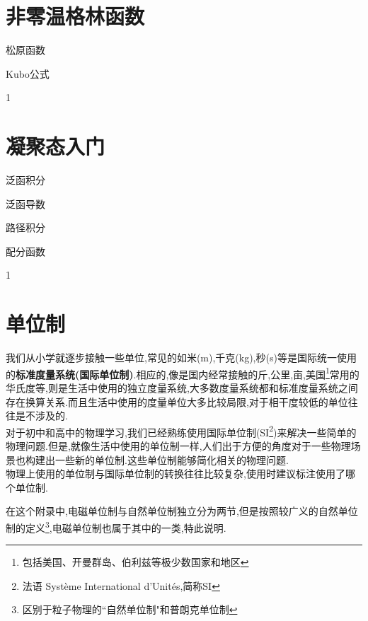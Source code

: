 \documentclass[lang=cn,newtx,10pt,scheme=chinese,thmcnt=section]{elegantbook}
\begin{document}
\chapter{非零温格林函数}
\begin{introduction}
	\item 松原函数
	\item Kubo公式
\end{introduction}
1

\chapter{凝聚态入门}
\begin{introduction}
	\item 泛函积分
	\item 泛函导数
	\item 路径积分
	\item 配分函数
\end{introduction}
1























\nocite{*}

\printbibliography[heading=bibintoc, title=\ebibname]
\appendix

\chapter{单位制}
我们从小学就逐步接触一些单位,常见的如米(m),千克(kg),秒(s)等是国际统一使用的\textbf{标准度量系统(国际单位制)}.相应的,像是国内经常接触的斤,公里,亩,美国\footnote{包括美国、开曼群岛、伯利兹等极少数国家和地区}常用的华氏度等,则是生活中使用的独立度量系统,大多数度量系统都和标准度量系统之间存在换算关系.而且生活中使用的度量单位大多比较局限,对于相干度较低的单位往往是不涉及的.\\
对于初中和高中的物理学习,我们已经熟练使用国际单位制(SI\footnote{法语 Système International d'Unités,简称SI})来解决一些简单的物理问题.但是,就像生活中使用的单位制一样,人们出于方便的角度对于一些物理场景也构建出一些新的单位制.这些单位制能够简化相关的物理问题.\\物理上使用的单位制与国际单位制的转换往往比较复杂,使用时建议标注使用了哪个单位制.\\
\begin{remark}
	在这个附录中,电磁单位制与自然单位制独立分为两节,但是按照较广义的自然单位制的定义\footnote{区别于粒子物理的``自然单位制"和普朗克单位制},电磁单位制也属于其中的一类,特此说明.
\end{remark}
\end{document}
